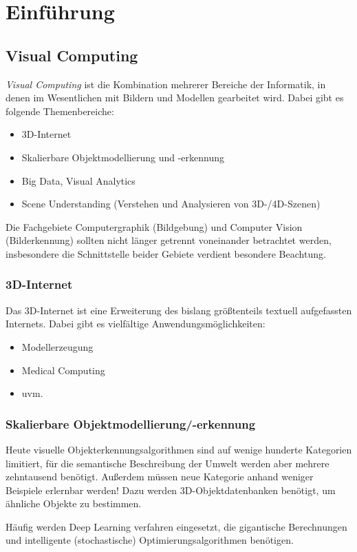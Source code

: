 \chapter{Einführung}
	\section{Visual Computing}
		\emph{Visual Computing} ist die Kombination mehrerer Bereiche der Informatik, in denen im Wesentlichen mit Bildern und Modellen gearbeitet wird. Dabei gibt es \zB folgende Themenbereiche:
		\begin{itemize}
			\item 3D-Internet
			\item Skalierbare Objektmodellierung und -erkennung
			\item Big Data, Visual Analytics
			\item Scene Understanding (Verstehen und Analysieren von 3D-/4D-Szenen)
		\end{itemize}
		Die Fachgebiete Computergraphik (Bildgebung) und Computer Vision (Bilderkennung) sollten nicht länger getrennt voneinander betrachtet werden, insbesondere die Schnittstelle beider Gebiete verdient besondere Beachtung.

		\subsection{3D-Internet}
			Das 3D-Internet ist eine Erweiterung des bislang größtenteils textuell aufgefassten Internets. Dabei gibt es vielfältige Anwendungsmöglichkeiten:
			\begin{itemize}
				\item Modellerzeugung
				\item Medical Computing
				\item uvm.
			\end{itemize}

		\subsection{Skalierbare Objektmodellierung/-erkennung}
			Heute visuelle Objekterkennungsalgorithmen sind auf wenige hunderte Kategorien limitiert, für die semantische Beschreibung der Umwelt werden aber mehrere zehntausend benötigt. Außerdem müssen neue Kategorie anhand weniger Beispiele erlernbar werden! Dazu werden 3D-Objektdatenbanken benötigt, um ähnliche Objekte zu bestimmen.
			
			Häufig werden Deep Learning verfahren eingesetzt, die gigantische Berechnungen und intelligente (stochastische) Optimierungsalgorithmen benötigen.

